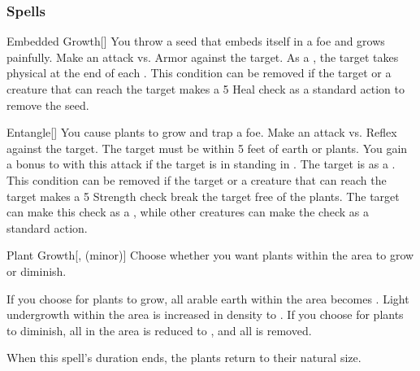 \subsubsection{Spells}


\lowercase{\hypertarget{spell:Embedded Growth}{}}\label{spell:Embedded Growth}
\begin{freeability}[Rank 1]{\hypertarget{spell:Embedded Growth}{Embedded Growth}}[]
You throw a seed that embeds itself in a foe and grows painfully.
Make an attack vs. Armor against the target.
\hit As a , the target takes physical  at the end of each .
This condition can be removed if the target or a creature that can reach the target makes a  5 Heal check as a standard action to remove the seed.
\end{freeability}
\vspace{0.25em}



\lowercase{\hypertarget{spell:Entangle}{}}\label{spell:Entangle}
\begin{freeability}[Rank 1]{\hypertarget{spell:Entangle}{Entangle}}[]
You cause plants to grow and trap a foe.
Make an attack vs. Reflex against the target.
The target must be within 5 feet of earth or plants.
You gain a  bonus to  with this attack if the target is in standing in .
\hit The target is  as a .
This condition can be removed if the target or a creature that can reach the target makes a  5 Strength check break the target free of the plants.
The target can make this check as a , while other creatures can make the check as a standard action.
\end{freeability}
\vspace{0.25em}



\lowercase{\hypertarget{spell:Plant Growth}{}}\label{spell:Plant Growth}
\begin{freeability}[Rank 1]{\hypertarget{spell:Plant Growth}{Plant Growth}}[,  (minor)]
Choose whether you want plants within the area to grow or diminish.

If you choose for plants to grow, all arable earth within the area becomes .
Light undergrowth within the area is increased in density to .
If you choose for plants to diminish, all  in the area is reduced to , and all  is removed.

When this spell's duration ends, the plants return to their natural size.
\end{freeability}
\vspace{0.25em}



